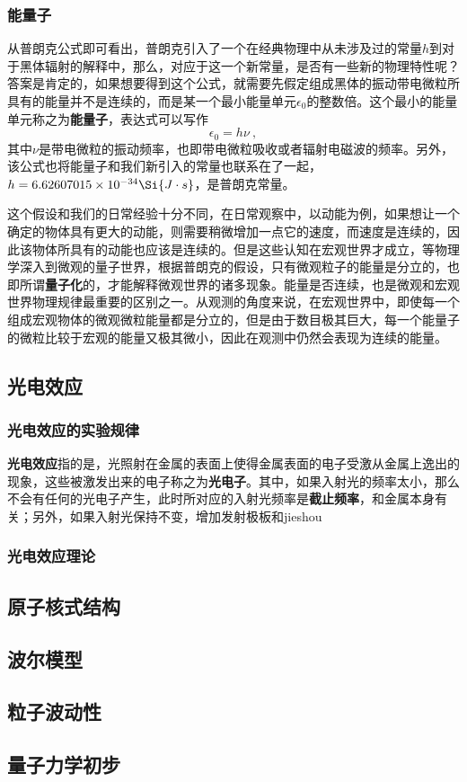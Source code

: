 \subsubsection{能量子}
从普朗克公式即可看出，普朗克引入了一个在经典物理中从未涉及过的常量$h$到对于黑体辐射的解释中，那么，对应于这一个新常量，是否有一些新的物理特性呢？答案是肯定的，如果想要得到这个公式，就需要先假定组成黑体的振动带电微粒所具有的能量并不是连续的，而是某一个最小能量单元$\epsilon_0$的整数倍。这个最小的能量单元称之为\textbf{能量子}，表达式可以写作$$\epsilon_0=h\nu ~,$$其中$\nu$是带电微粒的振动频率，也即带电微粒吸收或者辐射电磁波的频率。另外，该公式也将能量子和我们新引入的常量也联系在了一起，$h=6.62607015\times 10^{-34}\Si{J\cdot s}$，是普朗克常量。

这个假设和我们的日常经验十分不同，在日常观察中，以动能为例，如果想让一个确定的物体具有更大的动能，则需要稍微增加一点它的速度，而速度是连续的，因此该物体所具有的动能也应该是连续的。但是这些认知在宏观世界才成立，等物理学深入到微观的量子世界，根据普朗克的假设，只有微观粒子的能量是分立的，也即所谓\textbf{量子化}的，才能解释微观世界的诸多现象。能量是否连续，也是微观和宏观世界物理规律最重要的区别之一。从观测的角度来说，在宏观世界中，即使每一个组成宏观物体的微观微粒能量都是分立的，但是由于数目极其巨大，每一个能量子的微粒比较于宏观的能量又极其微小，因此在观测中仍然会表现为连续的能量。

\subsection{光电效应}
\subsubsection{光电效应的实验规律}
\textbf{光电效应}指的是，光照射在金属的表面上使得金属表面的电子受激从金属上逸出的现象，这些被激发出来的电子称之为\textbf{光电子}。其中，如果入射光的频率太小，那么不会有任何的光电子产生，此时所对应的入射光频率是\textbf{截止频率}，和金属本身有关；另外，如果入射光保持不变，增加发射极板和jieshou
\subsubsection{光电效应理论}
\subsection{原子核式结构}
\subsection{波尔模型}
\subsection{粒子波动性}
\subsection{量子力学初步}

% 
% 